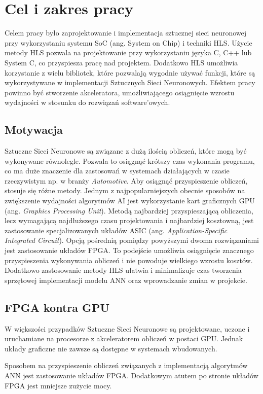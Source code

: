 \newpage %
\cleardoublepage %
\pagestyle{headings}

\section{Cel i zakres pracy}
Celem pracy było zaprojektowanie i implementacja sztucznej sieci neuronowej 
przy wykorzystaniu systemu SoC (ang. System on Chip) i techniki HLS. 
Użycie metody HLS pozwala na projektowanie  przy wykorzystaniu języka 
C, C++ lub System C, co przyspiesza pracę nad projektem. Dodatkowo HLS umożliwia
korzystanie z wielu bibliotek, które pozwalają wygodnie używać funkcji,
które są wykorzystywane w implementacji Sztucznych Sieci Neuronowych. 
Efektem pracy powinno być stworzenie akceleratora, umożliwiającego osiągnięcie 
wzrostu wydajności w stosunku do rozwiązań software’owych.

\subsection{Motywacja}
Sztuczne Sieci Neuronowe są związane z dużą ilością obliczeń, które mogą 
być wykonywane równolegle. Pozwala to osiągnąć krótszy czas wykonania 
programu, co ma duże znaczenie dla zastosowań w systemach działających 
w czasie rzeczywistym np. w branży \emph{Automotive}. Aby osiągnąć przyspieszenie 
obliczeń, stosuje się różne metody. Jednym z najpopularniejszych obecnie sposobów 
na zwiększenie wydajności algorytmów AI jest wykorzystanie kart graficznych GPU 
(ang. \emph{Graphics Processing Unit}). Metodą najbardziej przyspieszającą obliczenia,
lecz wymagającą najdłuższego czasu projektowania i najbardziej kosztowną,
jest zastosowanie specjalizowanych układów ASIC (ang. \emph{Application-Specific 
Integrated Circuit}). Opcją pośrednią pomiędzy powyższymi dwoma rozwiązaniami
jest zastosowanie układów FPGA. To podejście umożliwia osiągnięcie znacznego
przyspieszenia wykonywania obliczeń i nie powoduje wielkiego wzrostu kosztów. 
Dodatkowo zastosowanie metody HLS ułatwia i minimalizuje czas tworzenia sprzętowej 
implementacji modelu ANN oraz wprowadzanie zmian w projekcie. 

\subsection{FPGA kontra GPU}
W większości przypadków Sztuczne Sieci Neuronowe są projektowane, uczone i uruchamiane na procesorze z akceleratorem obliczeń w postaci GPU. Jednak układy graficzne nie zawsze są dostępne w systemach wbudowanych. 

Sposobem na przyspieszenie obliczeń związanych z implementacją algorytmów ANN jest zastosowanie układów FPGA. Dodatkowym atutem po stronie układów FPGA jest mniejsze zużycie mocy.
